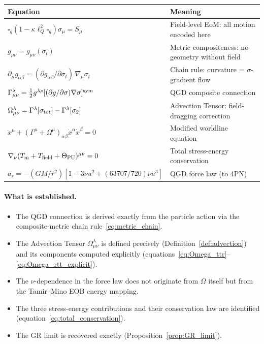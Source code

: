 \documentclass[11pt,a4paper]{article}
\theoremstyle{plain}
\theoremstyle{definition}
\theoremstyle{remark}
\newcommand{\lQ}{\ell_Q}
\newcommand{\boxg}{\square_g}
\begin{document}
\begin{center}
\renewcommand{\arraystretch}{1.4}
\begin{tabular}{p{6.5cm}p{6.5cm}}
\toprule
Equation & Meaning \\
\midrule
$\boxg(1-\kappa\lQ^2\boxg)\sigma_\mu = S_\mu$ &
  Field-level EoM: all motion encoded here \\
$g_{\mu\nu} = g_{\mu\nu}(\sigma_t)$ &
  Metric compositeness: no geometry without field \\
$\partial_\mu g_{\alpha\beta} = (\partial g_{\alpha\beta}/\partial\sigma_t)\,\nabla_\mu\sigma_t$ &
  Chain rule: curvature = $\sigma$-gradient flow \\
$\Gamma^\lambda_{\mu\nu} = \tfrac{1}{2}g^{\lambda\rho}[(\partial g/\partial\sigma)\nabla\sigma]^{\rm sym}$ &
  QGD composite connection \\
$\Omega^\lambda_{\mu\nu} = \Gamma^\lambda[\sigma_{\rm tot}] - \Gamma^\lambda[\sigma_2]$ &
  Advection Tensor: field-dragging correction \\
$\ddot x^\mu + (\Gamma^\mu + \Omega^\mu)_{\alpha\beta}\dot x^\alpha\dot x^\beta = 0$ &
  Modified worldline equation \\
$\nabla_\nu(T_{\rm m} + T_{\rm field} + \Theta_{\rm PU})^{\mu\nu} = 0$ &
  Total stress-energy conservation \\
$a_r = -(GM/r^2)[1 - 3\nu u^2 + (63707/720)\nu u^3]$ &
  QGD force law (to 4PN) \\
\bottomrule
\end{tabular}
\end{center}

\paragraph{What is established.}
\begin{itemize}[nosep]
  \item The QGD connection is derived exactly from the particle action via the
    composite-metric chain rule~\eqref{eq:metric_chain}.
  \item The Advection Tensor $\Omega^\lambda_{\mu\nu}$ is defined precisely
    (Definition~\ref{def:advection}) and its components computed explicitly
    (equations~\eqref{eq:Omega_ttr}--\eqref{eq:Omega_rtt_explicit}).
  \item The $\nu$-dependence in the force law does not originate from $\Omega$
    itself but from the Tamir--Mino EOB energy mapping.
  \item The three stress-energy contributions and their conservation law are
    identified (equation~\eqref{eq:total_conservation}).
  \item The GR limit is recovered exactly (Proposition~\ref{prop:GR_limit}).
\end{itemize}
\end{document}
